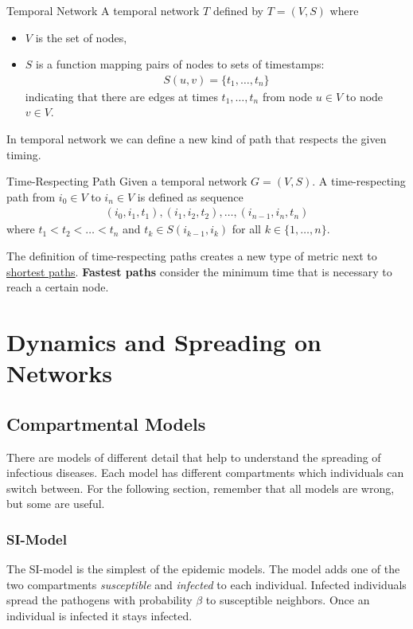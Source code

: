 \documentclass[english]{panikzettel}
\begin{document}
\begin{defi}{Temporal Network}
A temporal network $ T $ defined by $ T = (V,S) $ where
\begin{itemize}
	\item $ V $ is the set of nodes,
	\item $ S $ is a function mapping pairs of nodes to sets of timestamps:
\begin{align*}
	S(u,v) = \{t_1, \dots, t_n\}
\end{align*}
indicating that there are edges at times $ t_1, \dots, t_n $ from node $ u \in V $ to node $ v \in V $.
\end{itemize}
\end{defi}

In temporal network we can define a new kind of path that respects the given timing.

\begin{defi}{Time-Respecting Path}
Given a temporal network $ G = (V,S) $.
A time-respecting path from $ i_0 \in V $ to $ i_n \in V $ is defined as sequence
\begin{align*}
	(i_0,i_1,t_1), (i_1,i_2,t_2), \dots, (i_{n-1}, i_n,t_n)
\end{align*}
where $ t_1 < t_2 < \dots < t_n $ and $ t_k \in S(i_{k-1},i_k) $ for all $ k \in \{1, \dots, n\} $.
\end{defi}

The definition of time-respecting paths creates a new type of metric next to \hyperref[sec:distance]{shortest paths}.
\textbf{Fastest paths} consider the minimum time that is necessary to reach a certain node.

\section{Dynamics and Spreading on Networks}

\subsection{Compartmental Models}
There are models of different detail that help to understand the spreading of infectious diseases.
Each model has different compartments which individuals can switch between.
For the following section, remember that all models are wrong, but some are useful.

\subsubsection{SI-Model}
The SI-model is the simplest of the epidemic models.
The model adds one of the two compartments \textit{susceptible} and \textit{infected} to each individual.
Infected individuals spread the pathogens with probability $ \beta $ to susceptible neighbors.
Once an individual is infected it stays infected.
\end{document}
